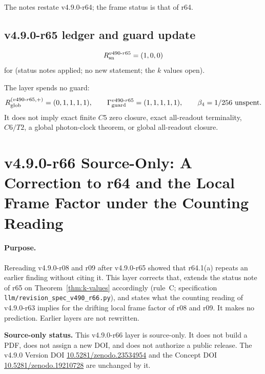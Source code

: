 The notes restate v4.9.0-r64; the frame status is that of r64.

\subsection*{v4.9.0-r65 ledger and guard update}
\label{subsec:v490-r65-ledger-guard}

\[
R_{\rm sn}^{v490\text{-}r65}=(1,0,0)
\]
for (status notes applied; no new statement; the \(k\) values open).

The layer spends no guard:
\[
R_{\rm glob}^{(v490\text{-}r65,+)}=(0,1,1,1,1),
\qquad
\Gamma_{\rm guard}^{v490\text{-}r65}=(1,1,1,1,1),
\qquad
\beta_4=1/256\ \text{unspent}.
\]
It does not imply exact finite \(C5\) zero closure, exact all-readout terminality,
\(C6/T2\), a global photon-clock theorem, or global all-readout closure.

\clearpage
\section*{v4.9.0-r66 Source-Only: A Correction to r64 and the Local Frame Factor under the Counting Reading}
\label{sec:v490-r66-correction-local-factor}

\paragraph{Purpose.}
Rereading v4.9.0-r08 and r09 after v4.9.0-r65 showed that r64.1(a) repeats an earlier finding without citing it.  This layer corrects that, extends the status
note of r65 on Theorem~\ref{thm:k-values} accordingly (rule~C; specification \texttt{llm/revision\_spec\_v490\_r66.py}), and states what the counting reading of
v4.9.0-r63 implies for the drifting local frame factor of r08 and r09.  It makes no prediction.  Earlier layers are not rewritten.

\noindent\textbf{Source-only status.}
This v4.9.0-r66 layer is source-only.  It does not build a PDF, does not assign a new DOI,
and does not authorize a public release.  The v4.9.0 Version DOI
\href{https://doi.org/10.5281/zenodo.23534954}{10.5281/zenodo.23534954} and the Concept DOI
\href{https://doi.org/10.5281/zenodo.19210728}{10.5281/zenodo.19210728} are unchanged by it.

